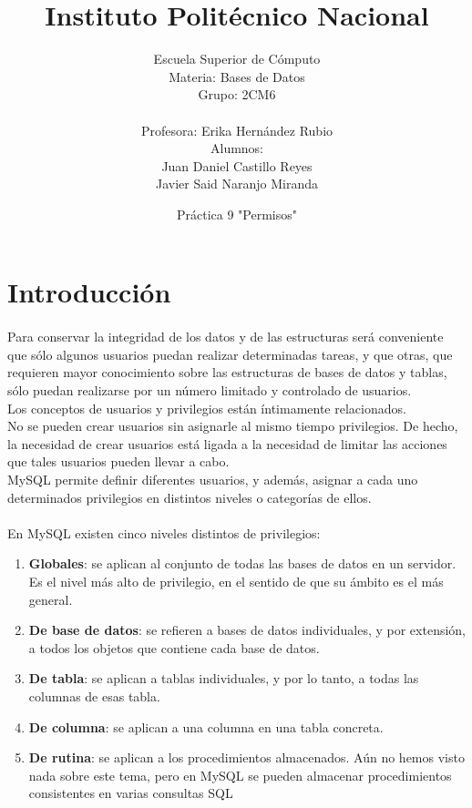 \documentclass[12pt,a4paper]{article}
\title{Instituto Politécnico Nacional}
\date{Práctica 9 "Permisos"}
\author{Escuela Superior de Cómputo\\Materia: Bases de Datos\\Grupo: 2CM6\\ \\ Profesora: Erika Hernández Rubio\\Alumnos: \\Juan Daniel Castillo Reyes\\Javier Said Naranjo Miranda}
\begin{document}
\maketitle
\tableofcontents
\section{Introducción}
\paragraph*{}
Para conservar la integridad de los datos y de las estructuras será conveniente que sólo algunos usuarios puedan realizar determinadas tareas, y que otras, que requieren mayor conocimiento sobre las estructuras de bases de datos y tablas, sólo puedan realizarse por un número limitado y controlado de usuarios.\\
Los conceptos de usuarios y privilegios están íntimamente relacionados.\\No se pueden crear usuarios sin asignarle al mismo tiempo privilegios. De hecho, la necesidad de crear usuarios está ligada a la necesidad de limitar las acciones que tales usuarios pueden llevar a cabo.\\
MySQL permite definir diferentes usuarios, y además, asignar a cada uno determinados privilegios en distintos niveles o categorías de ellos.\\ \\

En MySQL existen cinco niveles distintos de privilegios:
\begin{enumerate}
\item \textbf{Globales}: se aplican al conjunto de todas las bases de datos en un servidor. Es el nivel más alto de privilegio, en el sentido de que su ámbito es el más general.
\item \textbf{De base de datos}: se refieren a bases de datos individuales, y por extensión, a todos los objetos que contiene cada base de datos.
\item \textbf{De tabla}: se aplican a tablas individuales, y por lo tanto, a todas las columnas de esas tabla.
\item \textbf{De columna}: se aplican a una columna en una tabla concreta.
\item \textbf{De rutina}: se aplican a los procedimientos almacenados. Aún no hemos visto nada sobre este tema, pero en MySQL se pueden almacenar procedimientos consistentes en varias consultas SQL

\end{enumerate}
\end{document}
